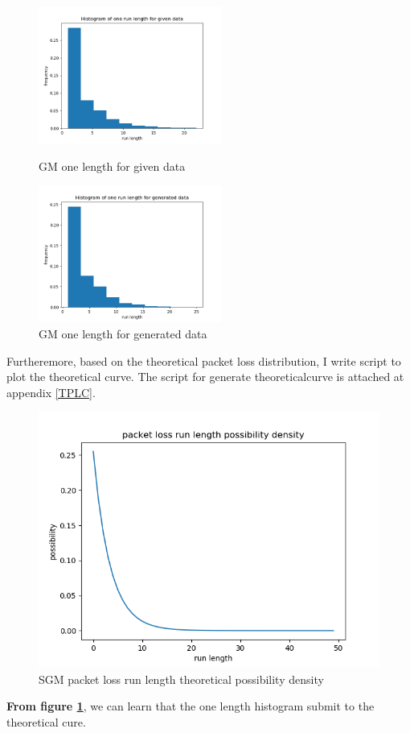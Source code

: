 \documentclass[11pt]{article}
\begin{document}
\begin{figure}[htbp]
    \centering
    \begin{minipage}[t]{0.48\textwidth}
    \centering
    \includegraphics[width=6cm]{GM_Histogram_of_one_run_length_for_given_data.png}
    \caption{GM one length for given data}
    \end{minipage}
    \begin{minipage}[t]{0.48\textwidth}
    \centering
    \includegraphics[width=6cm]{GM_Histogram_of_one_run_length_for_generated_data.png}
    \caption{GM one length for generated data}
    \end{minipage}
\end{figure}
Furtheremore, based on the theoretical packet loss distribution, I write script to plot the theoretical curve.
The  script  for  generate  theoreticalcurve is attached at appendix \ref{TPLC}.
\begin{figure}[htb]
    \centering
    \includegraphics[scale = 0.6]{GM_packet_loss_run_length_possibility_density.png}
    \caption{SGM packet loss run length theoretical possibility density}
    \label{GMTD}
\end{figure}
\textbf{From figure \ref{GMTD}}, we can learn that the one length histogram submit to the theoretical cure.
\end{document}
